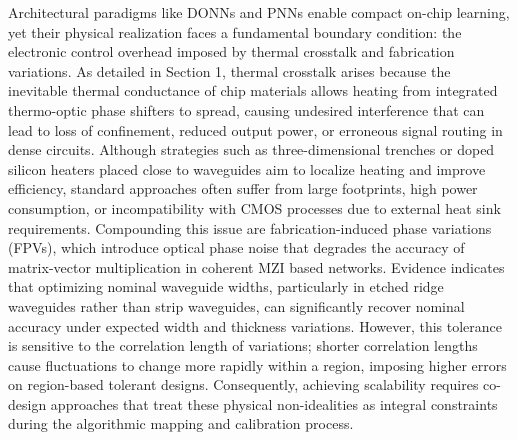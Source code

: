 \documentclass[11pt]{article}
\begin{document}
Architectural paradigms like DONNs and PNNs enable compact on-chip learning, yet their physical realization faces a fundamental boundary condition: the electronic control overhead imposed by thermal crosstalk and fabrication variations. As detailed in Section 1, thermal crosstalk arises because the inevitable thermal conductance of chip materials allows heating from integrated thermo-optic phase shifters to spread, causing undesired interference that can lead to loss of confinement, reduced output power, or erroneous signal routing in dense circuits. \citep{doi_10_1109_access_2020_3013116_8fec1fb2} Although strategies such as three-dimensional trenches or doped silicon heaters placed close to waveguides aim to localize heating and improve efficiency, standard approaches often suffer from large footprints, high power consumption, or incompatibility with CMOS processes due to external heat sink requirements. Compounding this issue are fabrication-induced phase variations (FPVs), which introduce optical phase noise that degrades the accuracy of matrix-vector multiplication in coherent MZI based networks. Evidence indicates that optimizing nominal waveguide widths, particularly in etched ridge waveguides rather than strip waveguides, can significantly recover nominal accuracy under expected width and thickness variations. However, this tolerance is sensitive to the correlation length of variations; shorter correlation lengths cause fluctuations to change more rapidly within a region, imposing higher errors on region-based tolerant designs. Consequently, achieving scalability requires co-design approaches that treat these physical non-idealities as integral constraints during the algorithmic mapping and calibration process. \citep{doi_10_1109_access_2020_3013116_8fec1fb2} \citep{doi_10_1109_tnano_2022_3223915_d4da3e6b}
\end{document}
